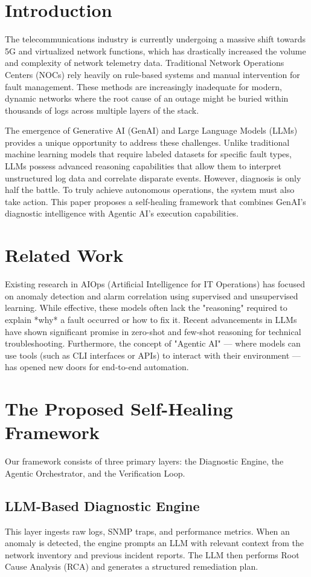 \documentclass[conference]{IEEEtran}
\begin{document}
\section{Introduction}
The telecommunications industry is currently undergoing a massive shift towards 5G and virtualized network functions, which has drastically increased the volume and complexity of network telemetry data. Traditional Network Operations Centers (NOCs) rely heavily on rule-based systems and manual intervention for fault management. These methods are increasingly inadequate for modern, dynamic networks where the root cause of an outage might be buried within thousands of logs across multiple layers of the stack.

The emergence of Generative AI (GenAI) and Large Language Models (LLMs) provides a unique opportunity to address these challenges. Unlike traditional machine learning models that require labeled datasets for specific fault types, LLMs possess advanced reasoning capabilities that allow them to interpret unstructured log data and correlate disparate events. However, diagnosis is only half the battle. To truly achieve autonomous operations, the system must also take action. This paper proposes a self-healing framework that combines GenAI's diagnostic intelligence with Agentic AI's execution capabilities.

\section{Related Work}
Existing research in AIOps (Artificial Intelligence for IT Operations) has focused on anomaly detection and alarm correlation using supervised and unsupervised learning. While effective, these models often lack the "reasoning" required to explain *why* a fault occurred or how to fix it. Recent advancements in LLMs have shown significant promise in zero-shot and few-shot reasoning for technical troubleshooting. Furthermore, the concept of "Agentic AI" --- where models can use tools (such as CLI interfaces or APIs) to interact with their environment --- has opened new doors for end-to-end automation.

\section{The Proposed Self-Healing Framework}
Our framework consists of three primary layers: the Diagnostic Engine, the Agentic Orchestrator, and the Verification Loop.

\subsection{LLM-Based Diagnostic Engine}
This layer ingests raw logs, SNMP traps, and performance metrics. When an anomaly is detected, the engine prompts an LLM with relevant context from the network inventory and previous incident reports. The LLM then performs Root Cause Analysis (RCA) and generates a structured remediation plan.
\end{document}
